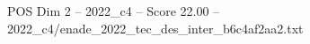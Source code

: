 \begin{textsample}{POS Dim 2 – 2022\_c4 – Score 22.00 – 2022\_c4/enade\_2022\_tec\_des\_inter\_b6c4af2aa2.txt}
\end{textsample}
